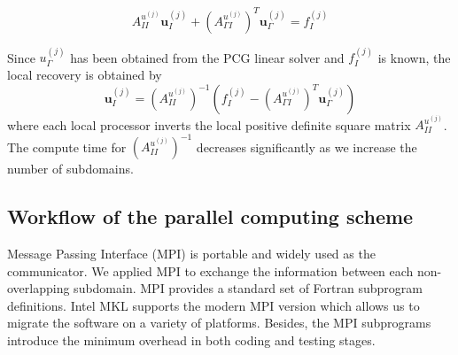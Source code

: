 \begin{equation}
A_{II}^{u^{(j)}} \mathbf{u}_{I}^{(j)} + (A_{\Gamma I}^{u^{(j)}})^{T} \mathbf{u}_{\Gamma}^{(j)} = f_{I}^{(j)}
\end{equation}

Since $ u_{\Gamma}^{(j)} $ has been obtained from the PCG linear solver and $ f_{I}^{(j)} $ is known, the local recovery is obtained by
\begin{equation} \label{eq:recover}
\mathbf{u}_{I}^{(j)} =  (A_{II}^{u^{(j)}})^{-1} (f_{I}^{(j)} - (A_{\Gamma I}^{u^{(j)}})^{T} \mathbf{u}_{\Gamma}^{(j)})
\end{equation} 
where each local processor inverts the local positive definite square matrix $ A_{II}^{u^{(j)}} $. The compute time for $  (A_{II}^{u^{(j)}})^{-1} $ decreases significantly as we increase the number of subdomains. 


\subsection{Workflow of the parallel computing scheme}

Message Passing Interface (MPI) \cite{gropp1996high} is portable and widely used as the communicator. We applied MPI to exchange the information between each non-overlapping subdomain. MPI provides a standard set of Fortran subprogram definitions. Intel MKL supports the modern MPI version which allows us to migrate the software on a variety of platforms. Besides, the MPI subprograms introduce the minimum overhead in both coding and testing stages.

